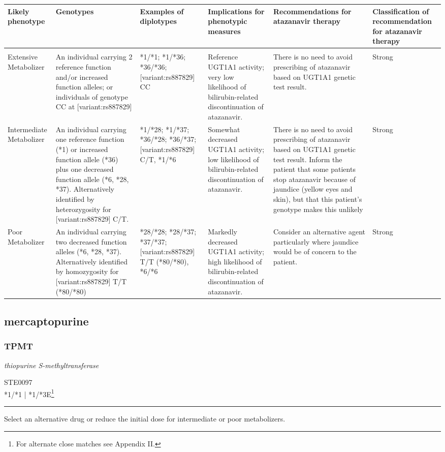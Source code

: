 \documentclass{report}
\begin{document}
      \begin{tabularx}{\textwidth}{ XXXXXX }
      \textbf{ Likely phenotype }&\textbf{ Genotypes }&\textbf{ Examples of diplotypes }&\textbf{ Implications for phenotypic measures   }&\textbf{ Recommendations for atazanavir therapy }&\textbf{ Classification of recommendation for atazanavir therapy } \\ \hline \\ Extensive Metabolizer & An individual carrying 2 reference  function and/or increased function alleles; or individuals of genotype CC at [variant:rs887829] & *1/*1; *1/*36; *36/*36; [variant:rs887829] CC& Reference  UGT1A1 activity; very low likelihood of bilirubin-related discontinuation of atazanavir.  &  There is no need to avoid prescribing of atazanavir based on UGT1A1 genetic test result.  &  Strong  \\ Intermediate Metabolizer  & An individual carrying one reference  function (*1)  or increased function allele (*36) plus one decreased function allele (*6, *28, *37). Alternatively identified by heterozygosity for [variant:rs887829] C/T. & *1/*28; *1/*37; *36/*28; *36/*37; [variant:rs887829] C/T, *1/*6 & Somewhat decreased UGT1A1 activity; low likelihood of bilirubin-related discontinuation of atazanavir. & There is no need to avoid prescribing of atazanavir based on UGT1A1 genetic test result. Inform the patient that some patients stop atazanavir because of jaundice (yellow eyes and skin), but that this patient’s genotype makes this unlikely &  Strong  \\ Poor Metabolizer  & An individual carrying two decreased function alleles (*6, *28, *37). Alternatively identified by homozygosity for [variant:rs887829] T/T (*80/*80) & *28/*28; *28/*37; *37/*37; [variant:rs887829] T/T (*80/*80), *6/*6  & Markedly decreased UGT1A1 activity; high likelihood of bilirubin-related discontinuation of atazanavir. & Consider an alternative agent particularly where jaundice would be of concern to the patient. &  Strong  \\ 
      \end{tabularx}
      
      \newpage
      \normalsize



\subsection{ mercaptopurine }

\subsubsection{ TPMT }
     \textit{ thiopurine S-methyltransferase } \begin{flushright} \textsc{ STE0097 \\ *1/*1  | *1/*3E\footnote{For alternate close matches see Appendix II.} }\end{flushright}
      \hrule \vspace{6pt}
      Select an alternative drug or reduce the initial dose for intermediate or poor metabolizers. \newline
      \scriptsize
      
\end{document}
